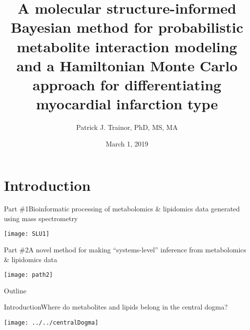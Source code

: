 \documentclass[xcolor=dvipsnames]{beamer}
\begin{document}
	
\title[Metabolite Interactomes \& HMC Modeling]{{\bf A molecular structure-informed Bayesian method for probabilistic metabolite interaction modeling and a Hamiltonian Monte Carlo approach for differentiating myocardial infarction type}}
\author[P.J. Trainor]{Patrick J. Trainor, PhD, MS, MA}
\date[March 2019]{March 1, 2019}

\begin{frame}
	\titlepage
\end{frame}

\section{Introduction}

\begin{frame}{Part \#1}{Bioinformatic processing of metabolomics \& lipidomics data generated using mass spectrometry}
\vspace{-15pt}
\begin{center}
	\texttt{[image: SLU1]}
\end{center}
\end{frame}

\begin{frame}{Part \#2}{A novel method for making ``systems-level'' inference from metabolomics \& lipidomics data}
\vspace{-15pt}
\begin{center}
\texttt{[image: path2]}
\end{center}
\end{frame}

\begin{frame}{Outline}
\vspace{-10.5pt}
\tableofcontents[currentsection,subsectionstyle=hide]
\addtocounter{framenumber}{-1}
\end{frame}

\begin{frame}{Introduction}{Where do metabolites and lipids belong in the central dogma?}
\vspace{-7 pt}
\begin{center}
		\texttt{[image: ../../centralDogma]}
	\end{center}
\end{frame}
\end{document}
